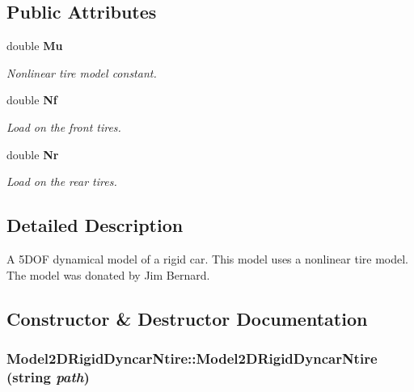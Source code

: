 \subsection*{Public Attributes}
\begin{CompactItemize}
\item 
double {\bf Mu}
\begin{CompactList}\small\item\em Nonlinear tire model constant.\item\end{CompactList}\item 
double {\bf Nf}
\begin{CompactList}\small\item\em Load on the front tires.\item\end{CompactList}\item 
double {\bf Nr}
\begin{CompactList}\small\item\em Load on the rear tires.\item\end{CompactList}\end{CompactItemize}


\subsection{Detailed Description}
A 5DOF dynamical model of a rigid car. This model uses a nonlinear tire model. The model was donated by Jim Bernard.



\subsection{Constructor \& Destructor Documentation}
\subsubsection{\setlength{\rightskip}{0pt plus 5cm}Model2DRigid\-Dyncar\-Ntire::Model2DRigid\-Dyncar\-Ntire (string {\em path})}\label{class_Model2DRigidDyncarNtire_a0}


